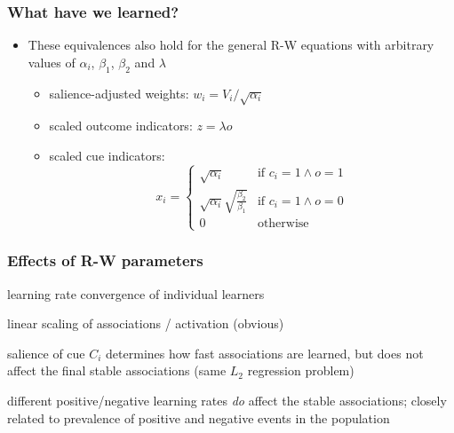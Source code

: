 \documentclass[t]{beamer} %
\begin{document}
\begin{frame}[c]
  \frametitle{What have we learned?}

  \begin{center}\Large
    \setlength{\fboxrule}{2pt}
  \end{center}  

  \begin{itemize}
  \item<2->[\hand] These equivalences also hold for the general R-W equations with arbitrary values of $\alpha_i$, $\beta_1$, $\beta_2$ and $\lambda$
    \begin{itemize}
    \item salience-adjusted weights: $w_i = V_i / \sqrt{\alpha_i}$  
    \item scaled outcome indicators: $z = \lambda o$
    \item scaled cue indicators:
      \[
        x_i = 
        \begin{cases}
          \sqrt{\alpha_i} & \text{if } c_i = 1 \wedge o = 1 \\
          \sqrt{\alpha_i} \sqrt{\frac{\beta_2}{\beta_1}} & \text{if } c_i = 1 \wedge o = 0 \\
          0 & \text{otherwise}
        \end{cases}
      \]
    \end{itemize}
  \end{itemize}

\end{frame}

\begin{frame}
  \frametitle{Effects of R-W parameters}

  
  \begin{description}
  \item<1->[$\beta > 0$:] learning rate \so convergence of individual learners
  \item<2->[$\lambda \neq 1$:]\gap[.5] linear scaling of associations / activation (obvious)
  \item<3->[$\alpha_i\neq 1$:]\gap[.5] salience of cue $C_i$ determines how fast associations are learned, but does not affect the final stable associations (same $L_2$ regression problem)
  \item<4->[$\beta_1 \neq \beta_2$:]\gap[.5] different positive/negative learning rates \emph{do} affect the stable associations; closely related to prevalence of positive and negative events in the population
  \end{description}
\end{frame}
\end{document}
